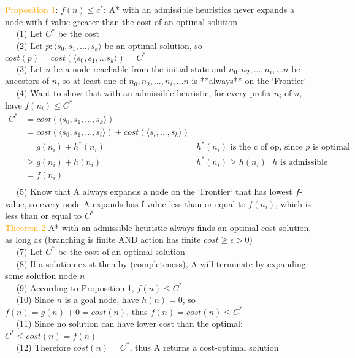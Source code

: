 \documentclass[10pt,landscape]{article}
\begin{document}
\begin{multicols}{2}
\textcolor{orange}{Proposition 1}: $f(n) \le c^*$:  A* with an admissible heuristics never expands a node with f-value greater than the cost of an optimal solution \\
$\quad$ (1) Let $C^*$ be the cost \\
$\quad$ (2) Let $p: \langle s_0, s_1, ..., s_k \rangle$ be an optimal solution, so $cost(p) = cost(\langle s_0, s_1, ...s_k \rangle) = C^*$ \\
$\quad$ (3) Let $n$ be a node reachable from the initial state and $n_0, n_2, ..., n_i, ...n$ be ancestors of $n$, so at least one of $n_0, n_2, ..., n_i, ...n$ is **always** on the `Frontier` \\
$\quad$ (4) Want to show that with an admissible heuristic, for every prefix $n_i$ of $n$, have $f(n_i) \le C^*$
    $$
    \begin{align}
    C^* &= cost(\langle s_0, s_1, ..., s_k \rangle) \\
    &= cost(\langle s_0, s_1, ..., s_i \rangle) + cost(\langle s_i, ..., s_k \rangle) \\
    &= g(n_i) + h^*(n_i) &\text{$h^*(n_i)$ is the c of op, since $p$ is optimal} \\
    &\ge g(n_i) + h(n_i) &\text{$h^*(n_i) \ge h(n_i)$ $h$ is admissible} \\
    &= f(n_i) \\
    \end{align}
    $$
$\quad$ (5) Know that A\* always expands a node on the `Frontier` that has lowest $f$-value, so every node A\* expands has f-value less than or equal to $f(n_i)$, which is less than or equal to $C^*$ \\


\textcolor{orange}{Theorem 2} A* with an admissible heuristic always finds an optimal cost solution, as long as (branching is finite AND action has finite $cost \ge \epsilon > 0$) \\
$\quad$ (7) Let $C^*$ be the cost of an optimal solution \\
$\quad$ (8) If a solution exist then by (completeness), A\* will terminate by expanding some solution node $n$ \\
$\quad$ (9) According to Proposition 1, $f(n) \le C^*$ \\
$\quad$ (10) Since $n$ is a goal node, have $h(n) = 0$, so $f(n) = g(n) + 0 = cost(n)$, thus $f(n) = cost(n) \le C^*$ \\
$\quad$ (11) Since no solution can have lower cost than the optimal: $C^* \le cost(n) = f(n)$ \\
$\quad$ (12) Therefore $cost(n) = C^*$, thus A\* returns a cost-optimal solution\\



\end{multicols}
\end{document}
